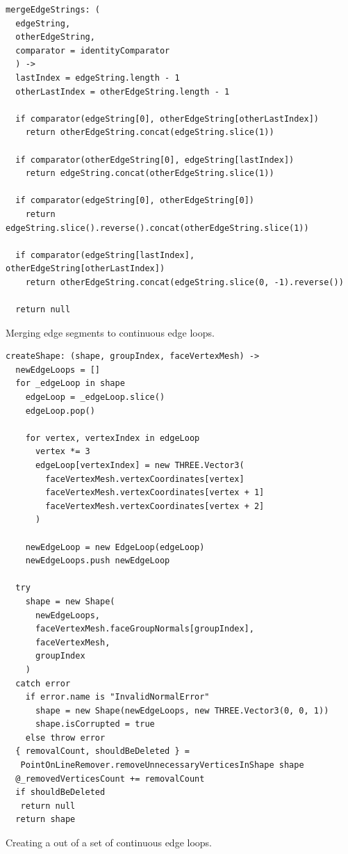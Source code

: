 \documentclass[../ClassicThesis.tex]{subfiles}
\begin{document}
\begin{listing}
\begin{verbatim}
mergeEdgeStrings: (
  edgeString,
  otherEdgeString,
  comparator = identityComparator
  ) ->
  lastIndex = edgeString.length - 1
  otherLastIndex = otherEdgeString.length - 1

  if comparator(edgeString[0], otherEdgeString[otherLastIndex])
    return otherEdgeString.concat(edgeString.slice(1))

  if comparator(otherEdgeString[0], edgeString[lastIndex])
    return edgeString.concat(otherEdgeString.slice(1))

  if comparator(edgeString[0], otherEdgeString[0])
    return edgeString.slice().reverse().concat(otherEdgeString.slice(1))

  if comparator(edgeString[lastIndex], otherEdgeString[otherLastIndex])
    return otherEdgeString.concat(edgeString.slice(0, -1).reverse())

  return null
\end{verbatim}
\caption{Merging edge segments to continuous edge loops.}
\label{lst:mergeEdgeStrings}
\end{listing}

\begin{listing}
\begin{verbatim}
createShape: (shape, groupIndex, faceVertexMesh) ->
  newEdgeLoops = []
  for _edgeLoop in shape
    edgeLoop = _edgeLoop.slice()
    edgeLoop.pop()

    for vertex, vertexIndex in edgeLoop
      vertex *= 3
      edgeLoop[vertexIndex] = new THREE.Vector3(
        faceVertexMesh.vertexCoordinates[vertex]
        faceVertexMesh.vertexCoordinates[vertex + 1]
        faceVertexMesh.vertexCoordinates[vertex + 2]
      )

    newEdgeLoop = new EdgeLoop(edgeLoop)
    newEdgeLoops.push newEdgeLoop

  try
    shape = new Shape(
      newEdgeLoops,
      faceVertexMesh.faceGroupNormals[groupIndex],
      faceVertexMesh,
      groupIndex
    )
  catch error
    if error.name is "InvalidNormalError"
      shape = new Shape(newEdgeLoops, new THREE.Vector3(0, 0, 1))
      shape.isCorrupted = true
    else throw error
  { removalCount, shouldBeDeleted } =
   PointOnLineRemover.removeUnnecessaryVerticesInShape shape
  @_removedVerticesCount += removalCount
  if shouldBeDeleted
   return null
  return shape
\end{verbatim}
\caption{Creating a  out of a set of continuous edge loops.}
\label{lst:createShape}
\end{listing}
\end{document}
